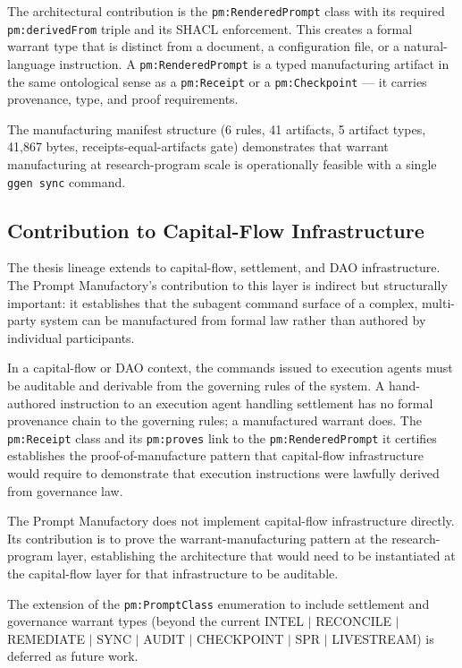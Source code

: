 The architectural contribution is the \texttt{pm:RenderedPrompt} class with its
required \texttt{pm:derivedFrom} triple and its SHACL enforcement. This creates a
formal warrant type that is distinct from a document, a configuration file, or a
natural-language instruction. A \texttt{pm:RenderedPrompt} is a typed manufacturing
artifact in the same ontological sense as a \texttt{pm:Receipt} or a
\texttt{pm:Checkpoint} --- it carries provenance, type, and proof requirements.

The manufacturing manifest structure (6 rules, 41 artifacts, 5 artifact types, 41,867
bytes, receipts-equal-artifacts gate) demonstrates that warrant manufacturing at
research-program scale is operationally feasible with a single \texttt{ggen sync}
command.

\subsection{Contribution to Capital-Flow Infrastructure}
\label{sec:research-prompt-manufactory-contribution-capital}

The thesis lineage extends to capital-flow, settlement, and DAO infrastructure. The
Prompt Manufactory's contribution to this layer is indirect but structurally important:
it establishes that the subagent command surface of a complex, multi-party system
can be manufactured from formal law rather than authored by individual participants.

In a capital-flow or DAO context, the commands issued to execution agents must be
auditable and derivable from the governing rules of the system. A hand-authored
instruction to an execution agent handling settlement has no formal provenance chain
to the governing rules; a manufactured warrant does. The \texttt{pm:Receipt} class and
its \texttt{pm:proves} link to the \texttt{pm:RenderedPrompt} it certifies establishes
the proof-of-manufacture pattern that capital-flow infrastructure would require to
demonstrate that execution instructions were lawfully derived from governance law.

The Prompt Manufactory does not implement capital-flow infrastructure directly. Its
contribution is to prove the warrant-manufacturing pattern at the research-program
layer, establishing the architecture that would need to be instantiated at the
capital-flow layer for that infrastructure to be auditable.

The extension of the \texttt{pm:PromptClass} enumeration to include settlement and
governance warrant types (beyond the current INTEL $\mid$ RECONCILE $\mid$ REMEDIATE
$\mid$ SYNC $\mid$ AUDIT $\mid$ CHECKPOINT $\mid$ SPR $\mid$ LIVESTREAM) is deferred
as future work.
